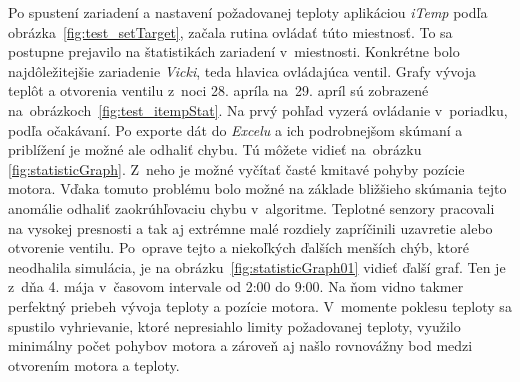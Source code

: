 Po spustení zariadení a nastavení požadovanej teploty aplikáciou \emph{iTemp} podľa obrázka~\ref{fig:test_setTarget}, začala rutina ovládať túto miestnosť. 
To sa postupne prejavilo na štatistikách zariadení v~miestnosti. 
Konkrétne bolo najdôležitejšie zariadenie \emph{Vicki}, teda hlavica ovládajúca ventil. 
Grafy vývoja teplôt a otvorenia ventilu z~noci 28. apríla na~29. apríl sú zobrazené na~obrázkoch~\ref{fig:test_itempStat}. 
Na prvý pohľad vyzerá ovládanie v~poriadku, podľa očakávaní. 
Po exporte dát do \emph{Excelu} a ich podrobnejšom skúmaní a priblížení je možné ale odhaliť chybu. 
Tú môžete vidieť na~obrázku \ref{fig:statisticGraph}.
Z~neho je možné vyčítať časté kmitavé pohyby pozície motora.
Vďaka tomuto problému bolo možné na základe bližšieho skúmania tejto anomálie odhaliť zaokrúhľovaciu chybu v~algoritme. 
Teplotné senzory pracovali na vysokej presnosti a tak aj extrémne malé rozdiely zapríčinili uzavretie alebo otvorenie ventilu. 
Po~oprave tejto a niekoľkých ďalších menších chýb, ktoré neodhalila simulácia, je na obrázku~\ref{fig:statisticGraph01} vidieť ďalší graf. 
Ten je z~dňa 4. mája v~časovom intervale od 2:00 do 9:00. 
Na ňom vidno takmer perfektný priebeh vývoja teploty a pozície motora.
V~momente poklesu teploty sa spustilo vyhrievanie, ktoré nepresiahlo limity požadovanej teploty, využilo minimálny počet pohybov motora a zároveň aj našlo rovnovážny bod medzi otvorením motora a teploty.

